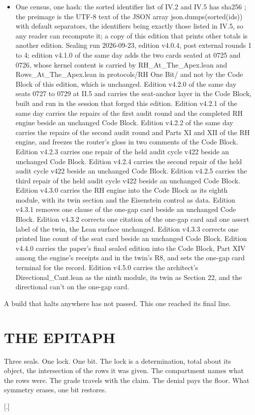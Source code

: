 \documentclass[10pt,twocolumn]{article}
\begin{document}
\begin{itemize}
\item
  One census, one hash: the sorted identifier list of IV.2 and IV.5 has
  sha256
  \texttt{};
  the preimage is the UTF-8 text of the JSON array
  json.dumps(sorted(ids)) with default separators, the identifiers being
  exactly those listed in IV.5, so any reader can recompute it; a copy
  of this edition that prints other totals is another edition. Sealing
  run 2026-09-23, edition v4.0.4, post external rounds 1 to 4; edition
  v4.1.0 of the same day adds the two cards seated at 0725 and 0726,
  whose kernel content is carried by RH\_At\_The\_Apex.lean and
  Rows\_At\_The\_Apex.lean in protocols/RH One Bit/ and not by the Code
  Block of this edition, which is unchanged. Edition v4.2.0 of the same
  day seats 0727 to 0729 at II.5 and carries the seat-anchor layer in
  the Code Block, built and run in the session that forged this edition.
  Edition v4.2.1 of the same day carries the repairs of the first audit
  round and the completed RH engine beside an unchanged Code Block.
  Edition v4.2.2 of the same day carries the repairs of the second audit
  round and Parts XI and XII of the RH engine, and freezes the router's
  gloss in two comments of the Code Block. Edition v4.2.3 carries one
  repair of the held audit cycle v422 beside an unchanged Code Block.
  Edition v4.2.4 carries the second repair of the held audit cycle v422
  beside an unchanged Code Block. Edition v4.2.5 carries the third
  repair of the held audit cycle v422 beside an unchanged Code Block.
  Edition v4.3.0 carries the RH engine into the Code Block as its eighth
  module, with its twin section and the Eisenstein control as data.
  Edition v4.3.1 removes one clause of the one-gap card beside an
  unchanged Code Block. Edition v4.3.2 corrects one citation of the
  one-gap card and one assert label of the twin, the Lean surface
  unchanged. Edition v4.3.3 corrects one printed line count of the seat
  card beside an unchanged Code Block. Edition v4.4.0 carries the
  paper's final sealed edition into the Code Block, Part XIV among the
  engine's receipts and in the twin's R8, and sets the one-gap card
  terminal for the record. Edition v4.5.0 carries the architect's
  Directional\_Cant.lean as the ninth module, its twin as Section 22,
  and the directional can't on the one-gap card.
\end{itemize}

A build that halts anywhere has not passed. This one reached its final
line.

\hypertarget{the-epitaph}{%
\section{THE EPITAPH}\label{the-epitaph}}

Three seals. One lock. One bit. The lock is a determination, total about
its object, the intersection of the rows it was given. The compartment
names what the rows were. The grade travels with the claim. The denial
pays the floor. What symmetry erases, one bit restores.

{[}.{]}
\end{document}
